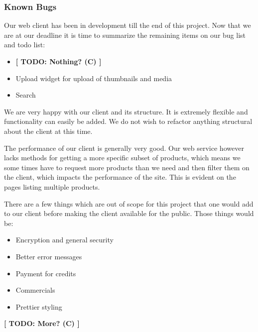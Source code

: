 \subsubsection{Known Bugs}
Our web client has been in development till the end of this project. Now that we are at our deadline it is time to summarize the remaining items on our bug list and todo list:

\begin{itemize}
\item \textbf{[ TODO: Nothing? (C) ]}
\end{itemize}

\begin{itemize}
\item Upload widget for upload of thumbnails and media
\item Search
\end{itemize}


We are very happy with our client and its structure. It is extremely flexible and functionality can easily be added. We do not wish to refactor anything structural about the client at this time.

The performance of our client is generally very good. Our web service however lacks methods for getting a more specific subset of products, which means we some times have to request more products than we need and then filter them on the client, which impacts the performance of the site. This is evident on the pages listing multiple products.

There are a few things which are out of scope for this project that one would add to our client before making the client available for the public. Those things would be:
\begin{itemize}
\item Encryption and general security
\item Better error messages
\item Payment for credits
\item Commercials
\item Prettier styling
\end{itemize}
\textbf{[ TODO: More? (C) ]}